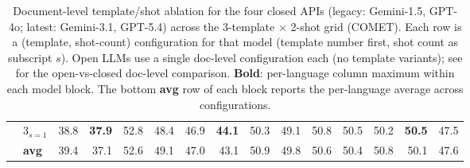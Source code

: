 \begin{table}[t]
{\begin{tabular}{llrrrrrrrrrrrrr}
 & 3$_{s=1}$ & 38.8 & \textbf{37.9} & 52.8 & 48.4 & 46.9 & \textbf{44.1} & 50.3 & 49.1 & 50.8 & 50.5 & 50.2 & \textbf{50.5} & 47.5 \\
\cmidrule(l){2-15}
 & \textbf{avg} & 39.4 & 37.1 & 52.6 & 49.1 & 47.0 & 43.1 & 50.9 & 49.8 & 50.6 & 50.4 & 50.8 & 50.1 & 47.6 \\
\bottomrule
\end{tabular}
}
\caption{Document-level template/shot ablation for the four closed APIs (legacy: Gemini-1.5, GPT-4o; latest: Gemini-3.1, GPT-5.4) across the 3-template $\times$ 2-shot grid (COMET). Each row is a (template, shot-count) configuration for that model (template number first, shot count as subscript $s$). Open LLMs use a single doc-level configuration each (no template variants); see  for the open-vs-closed doc-level comparison. \textbf{Bold}: per-language column maximum within each model block. The bottom \textbf{avg} row of each block reports the per-language average across configurations.}
\label{tab:doc_template_shot_ablation_comet}
\end{table}
